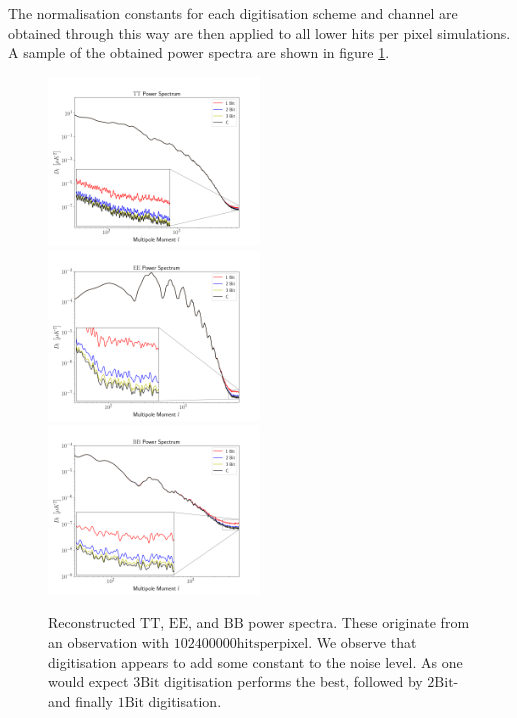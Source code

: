 \documentclass[apj]{emulateapj}
\begin{document}
The normalisation constants for each digitisation scheme and channel are obtained through this way are then applied to all lower hits per pixel simulations. A sample of the obtained power spectra are shown in figure \ref{fig:powspeczoom}.

\begin{figure}[htb]\centering
\includegraphics[width=0.5\textwidth,clip]{Plots/ttzoom.png}
\includegraphics[width=0.5\textwidth,clip]{Plots/eezoom.png}
\includegraphics[width=0.5\textwidth,clip]{Plots/bbzoom.png}
  \caption[Current ]{
   Reconstructed $\mathrm{TT}$, $\mathrm{EE}$, and $\mathrm{BB}$ power spectra. These originate from an observation with $102400000 \mathrm{hits per pixel}$. We observe that digitisation appears to add some constant to the noise level. As one would expect $3 \mathrm{Bit}$ digitisation performs the best, followed by $2 \mathrm{Bit}$- and finally $1 \mathrm{Bit}$ digitisation.
\label{fig:powspeczoom}
}
\end{figure}
\end{document}
